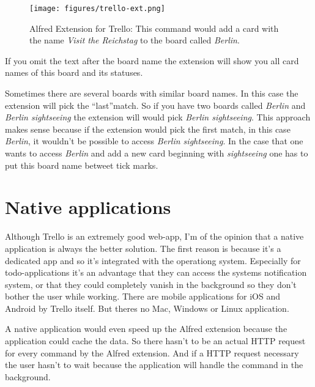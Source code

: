 \begin{figure}[htb]
\centering
\texttt{[image: figures/trello-ext.png]}
\caption{Alfred Extension for Trello: This command would add a card with the name \emph{Visit the Reichstag} to the board called \emph{Berlin}.}
\label{fig:trello-ext}
\end{figure}

If you omit the text after the board name the extension will show you all card names of this board and its statuses.

Sometimes there are several boards with similar board names. In this case the extension will pick the \textquotedblleft last\textquotedblright match. So if you have two boards called \emph{Berlin} and \emph{Berlin sightseeing} the extension will would pick \emph{Berlin sightseeing}. This approach makes sense because if the extension would pick the first match, in this case \emph{Berlin}, it wouldn't be possible to access \emph{Berlin sightseeing}. In the case that one wants to access \emph{Berlin} and add a new card beginning with \emph{sightseeing} one has to put this board name betweet tick marks.


\section{Native applications}
Although Trello is an extremely good web-app, I'm of the opinion that a native application is always the better solution. The first reason is because it's a dedicated app and so it's integrated with the operationg system. Especially for todo-applications it's an advantage that they can access the systems notification system, or that they could completely vanish in the background so they don't bother the user while working. There are mobile applications for iOS \cite{trello:ios} and Android \cite{trello:android} by Trello itself. But theres no Mac, Windows or Linux application.

A native application would even speed up the Alfred extension because the application could cache the data. So there hasn't to be an actual HTTP request for every command by the Alfred extension. And if a HTTP request necessary the user hasn't to wait because the application will handle the command in the background.